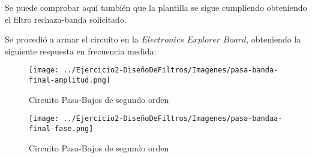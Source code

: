 Se puede comprobar aquí también que la plantilla se sigue cumpliendo obteniendo el filtro rechaza-banda solicitado.

Se procedió a armar el circuito en la $Electronics$ $Explorer$ $Board$, obteniendo la siguiente respuesta en frecuencia medida:

\begin{figure}[H]
    \centering
    \texttt{[image: ../Ejercicio2-DiseñoDeFiltros/Imagenes/pasa-banda-final-amplitud.png]}
    \caption{Circuito Pasa-Bajos de segundo orden}
\end{figure}

\begin{figure}[H]
    \centering
    \texttt{[image: ../Ejercicio2-DiseñoDeFiltros/Imagenes/pasa-bandaa-final-fase.png]}
    \caption{Circuito Pasa-Bajos de segundo orden}
\end{figure}